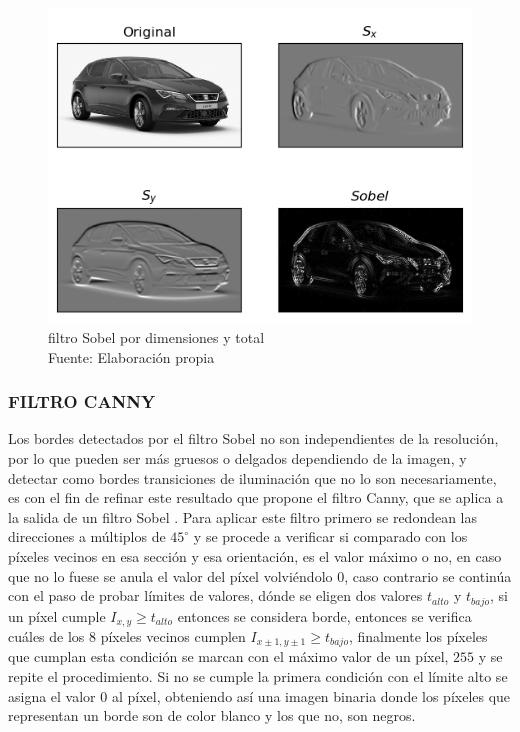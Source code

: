         \begin{figure}[H]
            \centering
            \includegraphics[scale=0.47]{imagenes/sobel_filters}
            \caption{filtro Sobel por dimensiones y total\\ Fuente: Elaboración propia}
        \end{figure}
        \subsubsection{FILTRO CANNY}
        Los bordes detectados por el filtro Sobel no son independientes de la resolución, por lo que pueden ser más gruesos o delgados dependiendo de la imagen, y detectar como bordes transiciones de iluminación que no lo son necesariamente, es con el fin de refinar este resultado que propone el filtro Canny, que se aplica a la salida de un filtro Sobel \citep{canny}.
        Para aplicar este filtro primero se redondean las direcciones a múltiplos de $45^\circ$ y se procede a verificar si comparado con los píxeles vecinos en esa sección y esa orientación, es el valor máximo o no, en caso que no lo fuese se anula el valor del píxel volviéndolo $0$, caso contrario se continúa con el paso de probar límites de valores, dónde se eligen dos valores $t_{alto}$ y $t_{bajo}$, si un píxel cumple $I_{x,y} \ge t_{alto}$ entonces se considera borde, entonces se verifica cuáles de los 8 píxeles vecinos cumplen $I_{x\pm 1, y \pm 1} \ge t_{bajo}$, finalmente los píxeles que cumplan esta condición se marcan con el máximo valor de un píxel, $255$ y se repite el procedimiento. Si no se cumple la primera condición con el límite alto se asigna el valor $0$ al píxel, obteniendo así una imagen binaria donde los píxeles que representan un borde son de color blanco y los que no, son negros.
        
